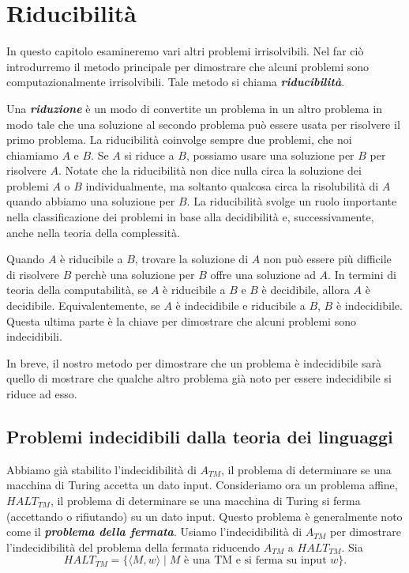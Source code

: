 \documentclass{article}
\begin{document}
\section{Riducibilità}
In questo capitolo esamineremo vari altri problemi irrisolvibili.
Nel far ciò introdurremo il metodo principale per dimostrare che alcuni problemi sono computazionalmente irrisolvibili.
Tale metodo si chiama \textbf{\textit{riducibilità}}.

Una \textbf{\textit{riduzione}} è un modo di convertite un problema in un altro problema in modo tale che una soluzione al secondo problema può essere usata per risolvere il primo problema.
La riducibilità coinvolge sempre due problemi, che noi chiamiamo $A$ e $B$.
Se $A$ si riduce a $B$, possiamo usare una soluzione per $B$ per risolvere $A$.
Notate che la riducibilità non dice nulla circa la soluzione dei problemi $A$ o $B$ individualmente, ma soltanto qualcosa circa la risolubilità di $A$ quando abbiamo una soluzione per $B$.
\newline
La riducibilità svolge un ruolo importante nella classificazione dei problemi in base alla decidibilità e, successivamente, anche nella teoria della complessità.

Quando $A$ è riducibile a $B$, trovare la soluzione di $A$ non può essere più difficile di risolvere $B$ perchè una soluzione per $B$ offre una soluzione ad $A$.
In termini di teoria della computabilità, se $A$ è riducibile a $B$ e $B$ è decidibile, allora $A$ è decidibile.
Equivalentemente, se $A$ è indecidibile e riducibile a $B$, $B$ è indecidibile.
Questa ultima parte è la chiave per dimostrare che alcuni problemi sono indecidibili.

In breve, il nostro metodo per dimostrare che un problema è indecidibile sarà quello di mostrare che qualche altro problema già noto per essere indecidibile si riduce ad esso.

\subsection{Problemi indecidibili dalla teoria dei linguaggi}
Abbiamo già stabilito l'indecidibilità di $A_{TM}$, il problema di determinare se una macchina di Turing accetta un dato input.
Consideriamo ora un problema affine, $HALT_{TM}$, il problema di determinare se una macchina di Turing si ferma (accettando o rifiutando) su un dato input.
Questo problema è generalmente noto come il \textbf{\textit{problema della fermata}}.
Usiamo l'indecidibilità di $A_{TM}$ per dimostrare l'indecidibilità del problema della fermata riducendo $A_{TM}$ a $HALT_{TM}$.
Sia
$$
HALT_{TM} = \{\langle M,w \rangle \mid M \text{ è una TM e si ferma su input } w \}.
$$
\end{document}

